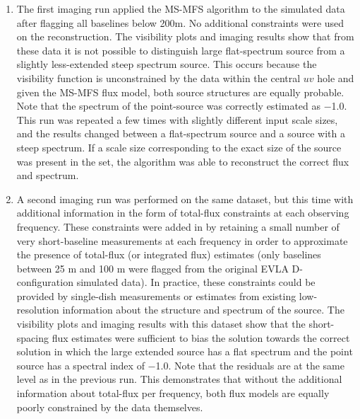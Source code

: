 \documentclass[structabstract]{stylefiles/aa}
\begin{document}
\begin{enumerate}
\item The first imaging run applied the MS-MFS algorithm to the 
simulated data after flagging all baselines below 200m. 
No additional constraints were used on the reconstruction.
The visibility plots and imaging results show that 
%
%
from these data it is not possible to distinguish large flat-spectrum 
source from a slightly less-extended steep spectrum source.
This occurs because the visibility function is unconstrained by the data
within the central $uv$ hole and 
given the MS-MFS flux model,
both source structures are equally probable.
Note that the spectrum of the point-source was correctly estimated as $-$1.0.
%
This run was repeated a few times with slightly different input scale
sizes, and the results changed between a flat-spectrum source and
a source with a steep spectrum. If a scale size corresponding
to the exact size of the source was present in the set, the algorithm
was able to reconstruct the correct flux and spectrum. 

\item A second imaging run was performed on the same dataset, but
this time with additional information in the form of total-flux 
constraints at each observing frequency. These constraints were
added in by retaining a small number of very short-baseline 
measurements at each frequency in order to approximate the
presence of total-flux (or integrated flux) estimates 
(only baselines between 25 m and 100 m were flagged from the original
 EVLA D-configuration simulated data).
In practice, these constraints could be provided by single-dish 
measurements or estimates from existing low-resolution information
about the structure and spectrum of the source.
%
%
The visibility plots and imaging results with this dataset 
show that the short-spacing flux estimates were sufficient to
bias the solution towards the correct solution in which the large
extended source has a flat spectrum and the point source has a
spectral index of $-$1.0.  Note that the residuals are at the same
level as in the previous run. This demonstrates that without 
the additional information about total-flux per frequency, both flux
models are equally poorly constrained by the data themselves.

\end{enumerate}
\end{document}
